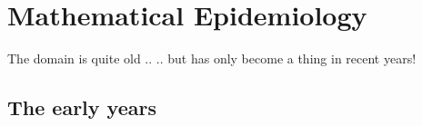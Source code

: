 \documentclass[aspectratio=169]{beamer}\usepackage[]{graphicx}\usepackage[]{xcolor}
\begin{document}
\section{Mathematical Epidemiology}

\begin{frame}{The domain is quite old ..}
.. but has only become a thing in recent years!
\end{frame}

\subsection{The early years}
\end{document}
